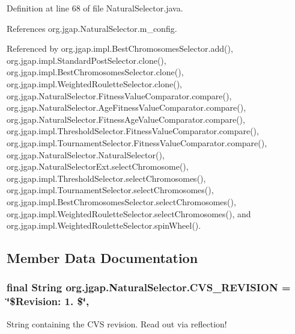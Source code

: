 Definition at line 68 of file Natural\-Selector.\-java.



References org.\-jgap.\-Natural\-Selector.\-m\-\_\-config.



Referenced by org.\-jgap.\-impl.\-Best\-Chromosomes\-Selector.\-add(), org.\-jgap.\-impl.\-Standard\-Post\-Selector.\-clone(), org.\-jgap.\-impl.\-Best\-Chromosomes\-Selector.\-clone(), org.\-jgap.\-impl.\-Weighted\-Roulette\-Selector.\-clone(), org.\-jgap.\-Natural\-Selector.\-Fitness\-Value\-Comparator.\-compare(), org.\-jgap.\-Natural\-Selector.\-Age\-Fitness\-Value\-Comparator.\-compare(), org.\-jgap.\-Natural\-Selector.\-Fitness\-Age\-Value\-Comparator.\-compare(), org.\-jgap.\-impl.\-Threshold\-Selector.\-Fitness\-Value\-Comparator.\-compare(), org.\-jgap.\-impl.\-Tournament\-Selector.\-Fitness\-Value\-Comparator.\-compare(), org.\-jgap.\-Natural\-Selector.\-Natural\-Selector(), org.\-jgap.\-Natural\-Selector\-Ext.\-select\-Chromosome(), org.\-jgap.\-impl.\-Threshold\-Selector.\-select\-Chromosomes(), org.\-jgap.\-impl.\-Tournament\-Selector.\-select\-Chromosomes(), org.\-jgap.\-impl.\-Best\-Chromosomes\-Selector.\-select\-Chromosomes(), org.\-jgap.\-impl.\-Weighted\-Roulette\-Selector.\-select\-Chromosomes(), and org.\-jgap.\-impl.\-Weighted\-Roulette\-Selector.\-spin\-Wheel().



\subsection{Member Data Documentation}
\hypertarget{classorg_1_1jgap_1_1_natural_selector_ae82aaa8c1ac8d50218d8178b1262d46c}{
\subsubsection[{C\-V\-S\-\_\-\-R\-E\-V\-I\-S\-I\-O\-N}]{\setlength{\rightskip}{0pt plus 5cm}final String org.\-jgap.\-Natural\-Selector.\-C\-V\-S\-\_\-\-R\-E\-V\-I\-S\-I\-O\-N = \char`\"{}\$Revision\-: 1. \$\char`\"{}\hspace{0.3cm}{\ttfamily [static]}, {\ttfamily [private]}}}\label{classorg_1_1jgap_1_1_natural_selector_ae82aaa8c1ac8d50218d8178b1262d46c}
String containing the C\-V\-S revision. Read out via reflection! 

